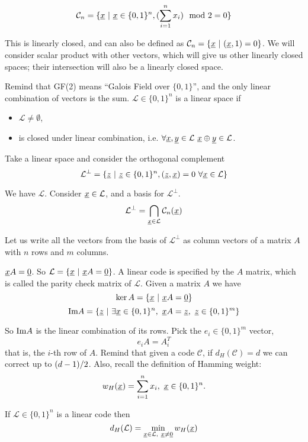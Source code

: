 \[
\mathcal{C}_n = \{\underline{x}\ |\ \underline{x} \in \{0, 1\}^n, (\sum_{i=1}^n x_i)\mod 2 = 0\}
\]

This is linearly closed, and can also be defined as $\mathcal{C}_n = \{\underline{x}\ |\ (\underline{x}, 1) = 0\}$. We will consider scalar product with other vectors, which will give us other linearly closed spaces; their intersection will also be a linearly closed space.

Remind that GF(2) means ``Galois Field over $\{0, 1\}$'', and the only linear combination of vectors is the sum. $\mathcal{L} \in \{0,1\}^n$ is a linear space if
\begin{itemize}
	\item $\mathcal{L} \not= \emptyset$,
	\item is closed under linear combination, i.e. $\forall \underline{x},\underline{y} \in \mathcal{L}\ \underline{x} \oplus \underline{y} \in \mathcal{L}$.
\end{itemize}

Take a linear space and consider the orthogonal complement
\[
\mathcal{L}^\perp = \{\underline{z}\ |\ \underline{z} \in \{0, 1\}^n, (\underline{z}, \underline{x}) = 0\ \forall \underline{x} \in \mathcal{L}\}
\]

We have $\mathcal{L}$. Consider $\underline{x} \in \mathcal{L}$, and a basis for $\mathcal{L}^\perp$.
\[
\mathcal{L}^\perp = \bigcap_{\underline{x} \in \mathcal{L}}\mathcal{C}_n(\underline{x})
\]

Let us write all the vectors from the basis of $\mathcal{L}^\perp$ as column vectors of a matrix $A$ with $n$ rows and $m$ columns.

$\underline{x}A = \underline{0}$. So $\mathcal{L} = \{\underline{x}\ |\ \underline{x}A = \underline{0}\}$. A linear code is specified by the $A$ matrix, which is called the parity check matrix of $\mathcal{L}$. Given a matrix $A$ we have
\[
\ker A = \{\underline{x}\ |\ \underline{x}A = \underline{0} \}
\]
\[
\im A = \{\str{z}\ |\ \exists \str{x} \in \{0, 1\}^n,\ \str{x}A = \str{z},\ \str{z} \in \{0, 1\}^m\}
\]

So $\text{Im} A$ is the linear combination of its rows. Pick the $e_i \in \{0, 1\}^m$ vector, 
\[
e_iA = A_i^T
\]
that is, the $i$-th row of $A$. Remind that given a code $\mathcal{C}$, if $d_H(\mathcal{C}) = d$ we can correct up to ${(d-1)}/{2}$. Also, recall the definition of Hamming weight:
\[
w_H(\underline{x}) = \sum_{i = 1}^n x_i,\ \underline{x} \in \{0, 1\}^n.
\]

\begin{obs}
	If $\mathcal{L} \in \{0, 1\}^n$ is a linear code then
	$$d_H(\mathcal{L}) = \min_{\underline{x} \in \mathcal{L},\ \underline{x} \not= \underline{0}}w_H(\underline{x})$$
\end{obs}

